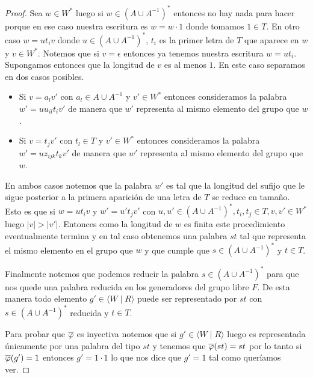 \documentclass[tesis.tex]{subfiles}
\begin{document}
\begin{proof}
		

		Sea $w \in W^{*}$ luego si $w \in (A \cup A^{-1})^{*}$ entonces no hay nada para hacer porque en ese caso nuestra escritura es $w = w \cdot 1$ donde tomamos $1 \in T$.
		En otro caso $w = ut_{i}v$ donde $u \in (A \cup A^{-1})^{*}$, $t_{i}$ es la primer letra de $T$ que aparece en $w$ y $v \in W^{*}$.
		Notemos que si $v = \epsilon$ entonces ya tenemos nuestra escritura $w = ut_{i}$.
		Supongamos entonces que la longitud de $v$ es al menos $1$.
		En este caso separamos en dos casos posibles.
		\begin{itemize}
			\item Si $v = a_{l} v'$ con $a_{l} \in A \cup A^{-1}$ y $v' \in W^{*}$ entonces consideramos la palabra $w' = uu_{il}t_{i}v'$ de manera que $w'$ representa al mismo elemento del grupo que $w$.
			\item Si $v = t_{j} v'$ con $t_{l} \in T$ y $v' \in W^{*}$ entonces consideramos la palabra $w' = uz_{ijk}t_{k}v'$ de manera que $w'$ representa al mismo elemento del grupo que $w$.
		\end{itemize} 
		En ambos casos notemos que la palabra $w'$ es tal que la longitud del sufijo que le sigue posterior a la primera aparición de una letra de $T$ se reduce en tamaño.
		Esto es que si $w = ut_{i}v$ y $w' = u't_{j}v'$ con $u,u' \in (A \cup A^{-1})^{*}, t_{i}, t_{j} \in T, v,v' \in W^{*}$ luego 
		$|v| > |v'|$.
		Entonces como la longitud de $w$ es finita este procedimiento eventualmente termina y en tal caso obtenemos una palabra $st$ tal que representa el mismo elemento en el grupo que $w$ y que cumple que $s \in (A \cup A^{-1})^{*}$ y $t \in T$.

		Finalmente notemos que podemos reducir la palabra $s \in (A \cup A^{-1})^{*}$ para que nos quede una palabra reducida en los generadores del grupo libre $F$.
		De esta manera todo elemento $g' \in \langle W \mid R\rangle$ puede ser representado por $st$ con $s \in (A \cup A^{-1})^{*}$ reducida y $t \in T$. 
		

		Para probar que $\overline{ \varphi}$ es inyectiva notemos que si $g' \in \langle W \mid R \rangle$ luego es representada únicamente por una palabra del tipo $st$ y tenemos que $\overline{\varphi}(st) = st$ por lo tanto si $\overline{\varphi}(g') = 1$ entonces $g' = 1 \cdot 1$ lo que nos dice que $g' = 1$ tal como queríamos ver.

	\end{proof}
\end{document}
